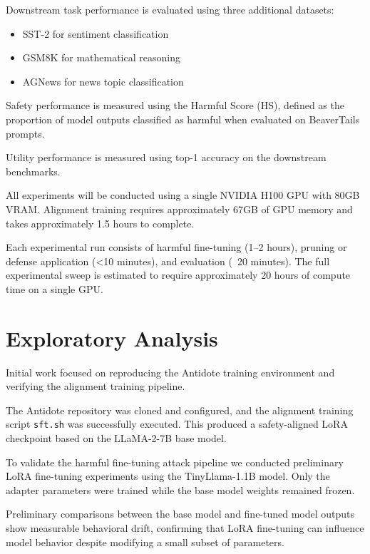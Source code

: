 \documentclass[11pt]{article}
\begin{document}
Downstream task performance is evaluated using three additional datasets:

\begin{itemize}
\item SST-2 \citep{socher2013sst} for sentiment classification
\item GSM8K \citep{cobbe2021gsm8k} for mathematical reasoning
\item AGNews \citep{zhang2015charcnn} for news topic classification
\end{itemize}

Safety performance is measured using the Harmful Score (HS), defined as the proportion of model outputs classified as harmful when evaluated on BeaverTails prompts.

Utility performance is measured using top-1 accuracy on the downstream benchmarks.

All experiments will be conducted using a single NVIDIA H100 GPU with 80GB VRAM. 
Alignment training requires approximately 67GB of GPU memory and takes approximately 1.5 hours to complete.

Each experimental run consists of harmful fine-tuning (1–2 hours), pruning or defense application (<10 minutes), and evaluation (~20 minutes). 
The full experimental sweep is estimated to require approximately 20 hours of compute time on a single GPU.

\section{Exploratory Analysis}

Initial work focused on reproducing the Antidote training environment and verifying the alignment training pipeline.

The Antidote repository was cloned and configured, and the alignment training script \texttt{sft.sh} was successfully executed. 
This produced a safety-aligned LoRA checkpoint based on the LLaMA-2-7B base model.

To validate the harmful fine-tuning attack pipeline we conducted preliminary LoRA fine-tuning experiments using the TinyLlama-1.1B model. 
Only the adapter parameters were trained while the base model weights remained frozen.

Preliminary comparisons between the base model and fine-tuned model outputs show measurable behavioral drift, confirming that LoRA fine-tuning can influence model behavior despite modifying a small subset of parameters.
\end{document}
